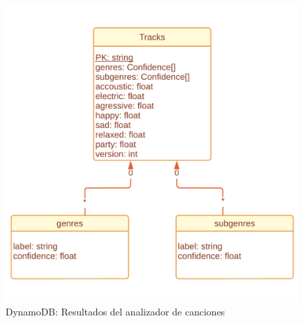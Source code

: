 \begin{figure}
    \centering
    \includegraphics{img/C/data_tracks.png}
    \caption{DynamoDB: Resultados del analizador de canciones}
    \label{fig:C:dynamo_results}
\end{figure}

